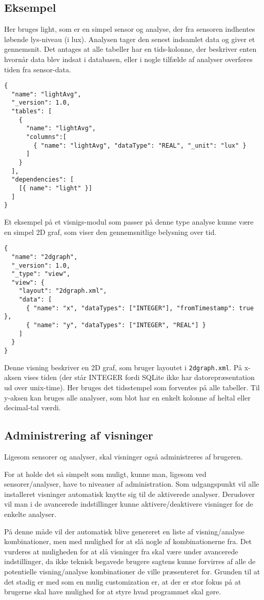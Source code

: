 \subsection{Eksempel}
Her bruges light, som er en simpel sensor og analyse, der fra sensoren indhentes løbende lys-niveau (i lux).
Analysen tager den senest indsamlet data og giver et gennemsnit.
Det antages at alle tabeller har en tids-kolonne, der beskriver enten hvornår data blev indsat i databasen, eller i nogle tilfælde af analyser overføres tiden fra sensor-data.

\begin{lstlisting}
{
  "name": "lightAvg",
  "_version": 1.0,
  "tables": [
    {
      "name": "lightAvg",
      "columns":[
        { "name": "lightAvg", "dataType": "REAL", "_unit": "lux" }
      ]
    }
  ],
  "dependencies": [
    [{ name": "light" }]
  ]
}
\end{lstlisting}

Et eksempel på et visnigs-modul som passer på denne type analyse kunne være en simpel 2D graf, som viser den gennemsnitlige belysning over tid.

\begin{lstlisting}
{
  "name": "2dgraph",
  "_version": 1.0,
  "_type": "view",
  "view": {
    "layout": "2dgraph.xml",
    "data": [
      { "name": "x", "dataTypes": ["INTEGER"], "fromTimestamp": true },
      { "name": "y", "dataTypes": ["INTEGER", "REAL"] }
    ]
  }
}
\end{lstlisting}
 
Denne visning beskriver en 2D graf, som bruger layoutet i \texttt{2dgraph.xml}.
På x-aksen vises tiden (der står INTEGER fordi SQLite ikke har datorepræsentation ud over unix-time).
Her bruges det tidsstempel som forventes på alle tabeller.
Til y-aksen kan bruges alle analyser, som blot har en enkelt kolonne af heltal eller decimal-tal værdi.

\subsection{Administrering af visninger}
Ligesom sensorer og analyser, skal visninger også administreres af brugeren.

For at holde det så simpelt som muligt, kunne man, ligesom ved sensorer/analyser, have to niveauer af administration.
Som udgangspunkt vil alle installeret visninger automatisk knytte sig til de aktiverede analyser.
Derudover vil man i de avancerede indstillinger kunne aktivere/deaktivere visninger for de enkelte analyser.

På denne måde vil der automatisk blive genereret en liste af visning/analyse kombinationer, men med mulighed for at slå nogle af kombinationerne fra.
Det vurderes at muligheden for at slå visninger fra skal være under avancerede indstillinger, da ikke teknisk begavede brugere sagtens kunne forvirres af alle de potentielle visning/analyse kombinationer de ville præsenteret for.
Grunden til at det stadig er med som en mulig customization er, at der er stor fokus på at brugerne skal have mulighed for at styre hvad programmet skal gøre. 
